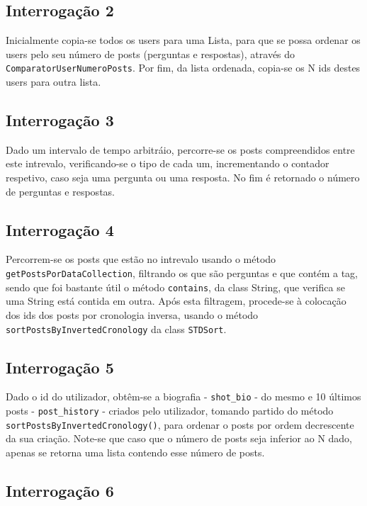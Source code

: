 \documentclass[11pt,a4paper]{article}
\begin{document}
\subsection{Interrogação 2}

Inicialmente copia-se todos os users para uma Lista, para que se possa ordenar os users pelo seu número de posts (perguntas e respostas), através do \texttt{ComparatorUserNumeroPosts}. Por fim, da lista ordenada, copia-se os N ids destes users para outra lista.

\subsection{Interrogação 3}

Dado um intervalo de tempo arbitráio, percorre-se os posts compreendidos entre este intrevalo, verificando-se o tipo de cada um, incrementando o contador respetivo, caso seja uma pergunta ou uma resposta. No fim é retornado o número de perguntas e respostas.

\subsection{Interrogação 4}

Percorrem-se os posts que estão no intrevalo usando o método \texttt{getPostsPorDataCollection}, filtrando os que são perguntas e que contém a tag, sendo que foi bastante útil o método \texttt{contains}, da class String, que verifica se uma String está contida em outra. Após esta filtragem, procede-se à colocação dos ids dos posts por cronologia inversa, usando o método \texttt{sortPostsByInvertedCronology} da class \texttt{STDSort}.

\subsection{Interrogação 5}

Dado o id do utilizador, obtêm-se a biografia - \texttt{shot\_bio} - do mesmo e 10 últimos posts - \texttt{post\_history} - criados pelo utilizador, tomando partido do método \texttt{sortPostsByInvertedCronology()}, para ordenar o posts por ordem decrescente da sua criação. Note-se que caso que o número de posts seja inferior ao N dado, apenas se retorna uma lista contendo esse número de posts.

\subsection{Interrogação 6}
\end{document}
